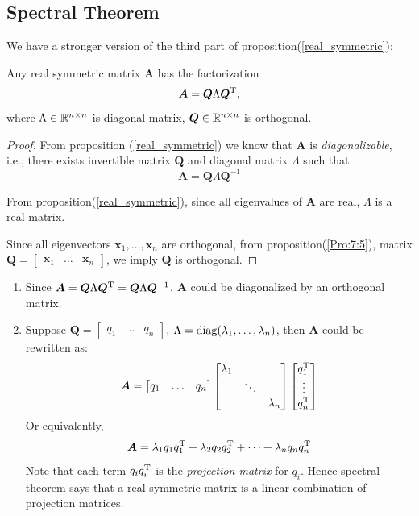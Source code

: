 \subsection{Spectral Theorem}
We have a stronger version of the third part of proposition(\ref{real_symmetric}):
\begin{theorem}
Any real symmetric matrix $\bm A$ has the factorization \begin{equation}
\bm A=\bm Q\Lambda\bm Q^{\mathrm T},
\end{equation} where $\Lambda\in\mathbb{R}^{n\times n}$ is diagonal matrix, $\bm Q\in\mathbb{R}^{n\times n}$ is orthogonal.
\end{theorem}
\begin{proof}
From proposition (\ref{real_symmetric}) we know that $\bm A$ is \textit{diagonalizable}, i.e., there exists invertible matrix $\bm Q$ and diagonal matrix $\Lambda$ such that
\[
\bm A=\bm Q\Lambda\bm Q^{-1}
\]

From proposition(\ref{real_symmetric}), since all eigenvalues of $\bm A$ are real, $\Lambda$ is a real matrix.

Since all eigenvectors $\bm x_1,\dots,\bm x_n$ are orthogonal, from proposition(\ref{Pro:7:5}), matrix $\bm Q=\begin{bmatrix}
\bm x_1&\dots&\bm x_n
\end{bmatrix}$,  we imply $\bm Q$ is orthogonal.
\end{proof}
\begin{remark}
\begin{enumerate}
\item
Since $\bm A=\bm Q\Lambda\bm Q^{\mathrm T}=\bm Q\Lambda\bm Q^{-1}$, $\bm A$ could be diagonalized by an orthogonal matrix.
\item
Suppose $\bm Q=\begin{bmatrix}
q_1&\dots&q_n
\end{bmatrix}$, $\Lambda=\operatorname{diag}(\lambda_1,\dots,\lambda_n)$, then $\bm A$ could be rewritten as:
\[
\bm A=
\begin{bmatrix}
q_1&\dots&q_n
\end{bmatrix}\begin{bmatrix}
\lambda_1&&\\&\ddots&\\&&\lambda_n
\end{bmatrix}\begin{bmatrix}
q_1^{\mathrm T}\\\vdots\\q_n^{\mathrm T}
\end{bmatrix}
\]
Or equivalently,
\begin{equation}
\bm A=\lambda_1q_1q_1^{\mathrm T}+\lambda_2q_2q_2^{\mathrm T}+\dots+\lambda_nq_nq_n^{\mathrm T}
\end{equation}
Note that each term $q_iq_i^{\mathrm T}$ is the \emph{projection matrix} for $q_i$. Hence spectral theorem says that a real symmetric matrix is a linear combination of projection matrices.
\end{enumerate}
\end{remark}

